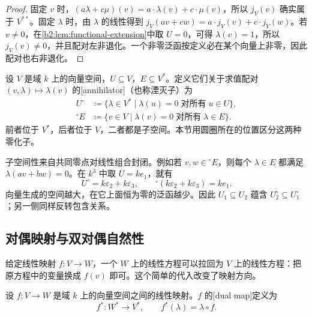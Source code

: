 \begin{proof}
	固定 \(v\) 时，\((a\lambda+c\mu)(v)=a\cdot\lambda(v)+c\cdot\mu(v)\)，所以 \(j_V(v)\) 确实属于 \(V^{**}\)。固定 \(\lambda\) 时，由 \(\lambda\) 的线性得到 \(j_V(av+cw)=a\cdot j_V(v)+c\cdot j_V(w)\)。若 \(v\ne0\)，在\cref{b2:lem:functional-extension}中取 \(U=0\)，可得 \(\lambda(v)=1\)，所以 \(j_V(v)\ne0\)，并且配对左非退化。一个非零泛函按定义必在某个向量上非零，因此配对也右非退化。
\end{proof}

\begin{definition}\label{b2:def:vector-annihilator}
	设 \(V\) 是域 \(k\) 上的向量空间，\(U\subseteq V\)，\(E\subseteq V^*\)。定义它们关于求值配对 \((v,\lambda)\mapsto\lambda(v)\) 的[annihilator]（也称湮灭子）为
	\[
		\begin{aligned}
			U^\circ&\coloneqq\{\lambda\in V^*\mid \lambda(u)=0\;\text{对所有}\;u\in U\},\\
			{}^\circ E&\coloneqq\{v\in V\mid \lambda(v)=0\;\text{对所有}\;\lambda\in E\}.
		\end{aligned}
	\]
	前者位于 \(V^*\)，后者位于 \(V\)，二者都是子空间。本节用圆圈所在的位置区分这两种零化子。
\end{definition}

子空间性来自共同零点对线性组合封闭。例如若 \(v,w\in{}^\circ E\)，则每个 \(\lambda\in E\) 都满足 \(\lambda(av+bw)=0\)。在 \(k^3\) 中取 \(U=k e_1\)，就有
\[
	U^\circ=k\varepsilon_2+k\varepsilon_3, \qquad {}^\circ(k\varepsilon_2+k\varepsilon_3)=k e_1.
\]
向量生成的空间越大，在它上面恒为零的泛函越少。因此 \(U_1\subseteq U_2\) 蕴含 \(U_2^\circ\subseteq U_1^\circ\)；另一侧同样反转包含关系。

\subsection{对偶映射与双对偶自然性}
\label{b2:subsec:0102:02}

给定线性映射 \(f:V\to W\)，一个 \(W\) 上的线性方程可以拉回为 \(V\) 上的线性方程：把原方程中的变量换成 \(f(v)\) 即可。这个简单的代入改变了映射方向。

\begin{definition}\label{b2:def:dual-map}
	设 \(f:V\to W\) 是域 \(k\) 上的向量空间之间的线性映射。\(f\) 的[dual map]定义为
	\[
		f^*:W^*\longrightarrow V^*,\qquad f^*(\lambda)=\lambda\circ f.
	\]
\end{definition}


